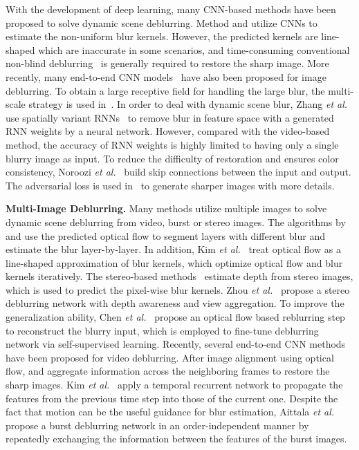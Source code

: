 \documentclass[10pt,twocolumn,letterpaper]{article}
\begin{document}
With the development of deep learning, many CNN-based methods have been proposed to solve dynamic scene deblurring.
Method \cite{sun2015learning} and \cite{gong2017motion} utilize CNNs to estimate the non-uniform blur kernels. However, the predicted kernels are line-shaped which are inaccurate in some scenarios, 
and time-consuming conventional non-blind deblurring~\cite{zoran2011learning} is generally required to restore the sharp image.
More recently, many end-to-end CNN models~\cite{tao2018scale, zhang2018dynamic, kupyn2018deblurgan, nah2017deep, noroozi2017motion} have also been proposed for image deblurring.
To obtain a large receptive field for handling the large blur, the multi-scale strategy is used in~\cite{tao2018scale,nah2017deep}.
In order to deal with dynamic scene blur, Zhang \textit{et al.}~\cite{zhang2018dynamic} use spatially variant RNNs~\cite{liu2016learning} to remove blur in feature space with a generated RNN weights by a neural network.
However, compared with the video-based method, the accuracy of RNN weights is highly limited to having only a single blurry image as input.
To reduce the difficulty of restoration and ensures color consistency, Noroozi \textit{et al.}~\cite{noroozi2017motion} build skip connections between the input and output.
The adversarial loss is used in~\cite{nah2017deep, kupyn2018deblurgan} to generate sharper images with more details.


\noindent \textbf{Multi-Image Deblurring.}
Many methods utilize multiple images to solve dynamic scene deblurring from video, burst or stereo images.
The algorithms by \cite{wulff2014modeling} and \cite{ren2017video} use the predicted optical flow to segment layers with different blur and estimate the blur layer-by-layer.
In addition, Kim \textit{et al.}~\cite{hyun2015generalized} treat optical flow as a line-shaped approximation of blur kernels, which optimize optical flow and blur kernels iteratively.
The stereo-based methods~\cite{xu2012depth, sellent2016stereo, pan2017simultaneous} estimate depth from stereo images, which is used to predict the pixel-wise blur kernels.
Zhou \textit{et al.}~\cite{zhou2019davanet} propose a stereo deblurring network with depth awareness and view aggregation.
To improve the generalization ability, Chen \textit{et al.}~\cite{chen2018reblur2deblur} propose an optical flow based reblurring step to reconstruct the blurry input, which is employed to fine-tune deblurring network via self-supervised learning.
Recently, several end-to-end CNN methods~\cite{su2017deep, hyun2017online, kim2018spatio} have been proposed for video deblurring.
After image alignment using optical flow, \cite{su2017deep} and \cite{kim2018spatio} aggregate information across the neighboring frames to restore the sharp images.
Kim \textit{et al.}~\cite{hyun2017online} apply a temporal recurrent network to propagate the features from the previous time step into those of the current one.
Despite the fact that motion can be the useful guidance for blur estimation, Aittala \textit{et al.}~\cite{aittala2018burst} propose a burst deblurring network in an order-independent manner by repeatedly exchanging the information between the features of the burst images.
\end{document}
